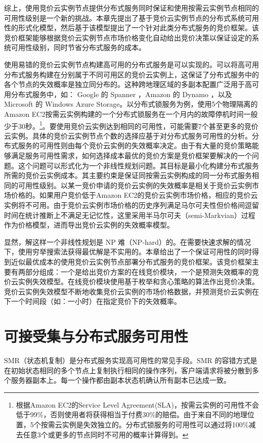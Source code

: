 综上，使用竞价云实例节点提供分布式服务同时保证和使用按需云实例节点相同的可用性级别是一个新的挑战。本章先提出了基于竞价云实例节点的分布式系统可用性的形式化模型，然后基于该模型提出了一个针对此类分布式服务的竞价框架。该竞价框架能够根据竞价云实例节点市场价格变化自动给出竞价决策以保证设定的系统可用性级别，同时节省分布式服务的成本。

使用易错的竞价云实例节点构建高可用的分布式服务是可以实现的。可以将高可用分布式服务构建在分别属于不同可用区的竞价云实例上，这保证了分布式服务中的各个节点的失效概率是独立同分布的。这种跨地理区域的多副本配置广泛用于高可用分布式服务中，如： Google 的 Spanner \cite{Corbett:2012:SGG:2387880.2387905}，Amazon 的 Dynamo \cite{DeCandia:2007:DAH:1294261.1294281}，以及Microsoft 的 Windows Azure Storage\cite{Calder:2011:WAS:2043556.2043571}。以分布式锁服务为例，使用5个物理隔离的Amazon EC2按需云实例构建的一个分布式锁服务在一个月内的故障停机时间一般少于30秒。\footnote{根据Amazon EC2的Service Level Agreement(SLA)，按需云实例的可用性不会低于99\%，否则使用者将获得相当于付费30\%的赔偿。由于来自不同的地理位置，5个按需云实例是失效独立的。分布式锁服务的可用性可以通过将100\%减去任意3个或更多的节点同时不可用的概率计算得到。}。要使用竞价云实例达到相同的可用性，可能需要7个甚至更多的竞价云实例。具体的竞价云实例节点个数的选择应基于对分布式服务可用性的分析。分布式服务的可用性则由每个竞价云实例的失效概率决定。由于有大量的竞价策略能够满足服务可用性需求，如何选择成本最优的竞价方案是竞价框架要解决的一个问题。这个问题可以形式化为一个非线性规划问题。其目标是最小化构建分布式服务所需的竞价云实例成本。其主要约束是保证同按需云实例构成的同一分布式服务相同的可用性级别。以某一竞价申请的竞价云实例的失效概率是相关于竞价云实例市场价格的。如果用户竞价低于Amazon EC2的竞价云实例市场价格，相应的竞价云实例将不可用。由于竞价云实例市场价格的历史序列满足马尔可夫性但价格间逗留时间在统计推断上不满足无记忆性，这里采用半马尔可夫（semi-Markvian）过程作为价格模型，进而导出竞价云实例的失效概率模型。

显然，解这样一个非线性规划是 NP 难（NP-hard）的。在需要快速求解的情况下，使用穷举搜索法获得最优解是不实用的。本章给出了一个保证可用性的同时得到近似最优成本的使用竞价云实例节点部署分布式服务的竞价框架。该竞价框架主要有两部分组成：一个是给出竞价方案的在线竞价模块，一个是预测失效概率的竞价云实例失效模型。在线竞价模块使用基于枚举和贪心策略的算法作出竞价决策。竞价云实例失效模型不断地收集竞价云实例的市场价格数据，并预测竞价云实例在下一个时间段（如：一小时）在指定竞价下的失效概率。

\section{可接受集与分布式服务可用性}
\label{sec:jupiter_dist_basis}
SMR（状态机复制）是分布式服务实现高可用性的常见手段。SMR 的容错方式是在初始状态相同的多个节点上复制执行相同的操作序列，客户端请求将被分散到多个服务器副本上。每一个操作都由副本状态机确认所有副本已达成一致。

